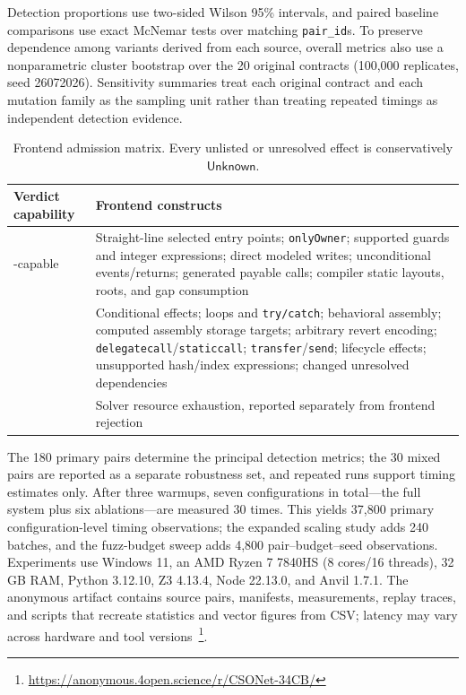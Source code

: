 \documentclass[runningheads]{llncs}
\newcommand{\Safe}{\mathsf{Safe}}
\newcommand{\Unknown}{\mathsf{Unknown}}
\newcommand{\Timeout}{\mathsf{Timeout}}
\begin{document}
Detection proportions use two-sided Wilson 95\% intervals, and paired baseline comparisons use exact McNemar tests over matching \texttt{pair\_id}s. To preserve dependence among variants derived from each source, overall metrics also use a nonparametric cluster bootstrap over the 20 original contracts (100,000 replicates, seed 26072026). Sensitivity summaries treat each original contract and each mutation family as the sampling unit rather than treating repeated timings as independent detection evidence.

\begin{table}[t]
\caption{Frontend admission matrix. Every unlisted or unresolved effect is conservatively \(\Unknown\).}
\label{tab:frontend-support}
\centering
\scriptsize
\begin{tabular}{@{}>{\raggedright\arraybackslash}m{}>{\raggedright\arraybackslash}m{}@{}}
\toprule
Verdict capability & Frontend constructs \\
\midrule
\Safe-capable & Straight-line selected entry points; \texttt{onlyOwner}; supported guards and integer expressions; direct modeled writes; unconditional events/returns; generated payable calls; compiler static layouts, roots, and gap consumption \\
\Unknown & Conditional effects; loops and \texttt{try/catch}; behavioral assembly; computed assembly storage targets; arbitrary revert encoding; \texttt{delegatecall}/\texttt{staticcall}; \texttt{transfer}/\texttt{send}; lifecycle effects; unsupported hash/index expressions; changed unresolved dependencies \\
\Timeout & Solver resource exhaustion, reported separately from frontend rejection \\
\bottomrule
\end{tabular}
\end{table}

The 180 primary pairs determine the principal detection metrics; the 30 mixed pairs are reported as a separate robustness set, and repeated runs support timing estimates only. After three warmups, seven configurations in total---the full system plus six ablations---are measured 30 times. This yields 37,800 primary configuration-level timing observations; the expanded scaling study adds 240 batches, and the fuzz-budget sweep adds 4,800 pair--budget--seed observations. Experiments use Windows 11, an AMD Ryzen 7 7840HS (8 cores/16 threads), 32\,GB RAM, Python 3.12.10, Z3 4.13.4, Node 22.13.0, and Anvil 1.7.1. The anonymous artifact contains source pairs, manifests, measurements, replay traces, and scripts that recreate statistics and vector figures from CSV; latency may vary across hardware and tool versions~\footnote{\url{https://anonymous.4open.science/r/CSONet-34CB/}}.
\end{document}

